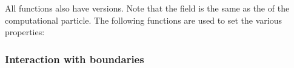 \documentclass[letterpaper,10pt,english]{sphinxmanual}
\begin{document}
\begin{sphinxVerbatim}[commandchars=\\\{\},formatcom=\scriptsize]
 
 
 
 
\end{sphinxVerbatim}

All functions also have  versions.
Note that the field  is the same as the  of the computational particle.
The following functions are used to set the various properties:

\begin{sphinxVerbatim}[commandchars=\\\{\},formatcom=\scriptsize]
  
  
  
  
\end{sphinxVerbatim}


\subsubsection{Interaction with boundaries}
\label{\detokenize{RTE:interaction-with-boundaries}}
\end{document}
